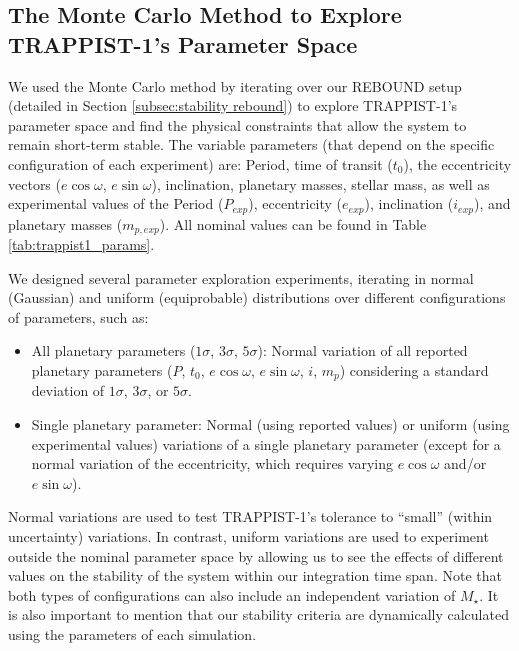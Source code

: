 \documentclass{aa}
\begin{document}
\subsection{The Monte Carlo Method to Explore TRAPPIST-1's Parameter Space}
\label{subsec:monte carlo}
We used the Monte Carlo method by iterating over our REBOUND setup (detailed in Section \ref{subsec:stability rebound}) to explore TRAPPIST-1's parameter space and find the physical constraints that allow the system to remain short-term stable. The variable parameters (that depend on the specific configuration of each experiment) are: Period, time of transit ($t_0$), the eccentricity vectors ($e\cos\omega$, $e\sin\omega$), inclination, planetary masses, stellar mass, as well as experimental values of the Period ($P_{exp}$), eccentricity ($e_{exp}$), inclination ($i_{exp}$), and planetary masses ($m_{p,exp}$). All nominal values can be found in Table \ref{tab:trappist1_params}.

We designed several parameter exploration experiments, iterating in normal (Gaussian) and uniform (equiprobable) distributions over different configurations of parameters, such as: 

\begin{itemize}[label=$\bullet$]
    \item All planetary parameters ($1\sigma$, $3\sigma$, $5\sigma$): Normal variation of all reported planetary parameters ($P$, $t_0$, $e\cos\omega$, $e\sin\omega$, $i$, $m_p$) considering a standard deviation of $1\sigma$, $3\sigma$, or $5\sigma$.
    \item Single planetary parameter: Normal (using reported values) or uniform (using experimental values) variations of a single planetary parameter (except for a normal variation of the eccentricity, which requires varying $e\cos\omega$ and/or $e\sin\omega$).
\end{itemize}

Normal variations are used to test TRAPPIST-1's tolerance to ``small'' (within uncertainty) variations. In contrast, uniform variations are used to experiment outside the nominal parameter space by allowing us to see the effects of different values on the stability of the system within our integration time span. Note that both types of configurations can also include an independent variation of $M_\star$. It is also important to mention that our stability criteria are dynamically calculated using the parameters of each simulation.
\end{document}
